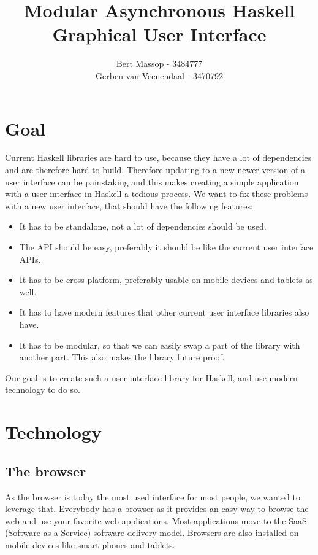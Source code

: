 \documentclass[11pt]{article}
\title{Modular Asynchronous Haskell Graphical User Interface}
\author{Bert Massop - 3484777\\
Gerben van Veenendaal - 3470792}
\begin{document}
\maketitle

\newpage
\tableofcontents

\newpage
\section{Goal}

Current Haskell libraries are hard to use, because they have a lot of dependencies and are therefore hard to build.
Therefore updating to a new newer version of a user interface can be painstaking and this makes creating a simple application with a user interface in Haskell a tedious process.
We want to fix these problems with a new user interface, that should have the following features:

\begin{itemize}
\item It has to be standalone, not a lot of dependencies should be used.
\item The API should be easy, preferably it should be like the current user interface APIs.
\item It has to be cross-platform, preferably usable on mobile devices and tablets as well.
\item It has to have modern features that other current user interface libraries also have.
\item It has to be modular, so that we can easily swap a part of the library with another part.
This also makes the library future proof.
\end{itemize}

Our goal is to create such a user interface library for Haskell, and use modern technology to do so.

\section{Technology}

\subsection{The browser}
As the browser is today the most used interface for most people, we wanted to leverage that.
Everybody has a browser as it provides an easy way to browse the web and use your favorite web applications.
Most applications move to the SaaS (Software as a Service) software delivery model.
Browsers are also installed on mobile devices like smart phones and tablets.
\end{document}
